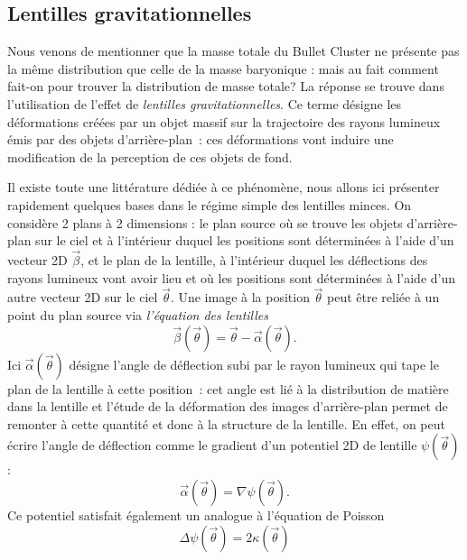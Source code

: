 \subsection{Lentilles gravitationnelles}
Nous venons de mentionner que la masse totale du Bullet Cluster ne présente pas la même distribution que celle de la masse baryonique : mais au fait comment fait-on pour trouver la distribution de masse totale? La réponse se trouve dans l'utilisation de l'effet de \textit{lentilles gravitationnelles}. Ce terme désigne les déformations créées par un objet massif sur la trajectoire des rayons lumineux émis par des objets d'arrière-plan~: ces déformations vont induire une modification de la perception de ces objets de fond.

Il existe toute une littérature dédiée à ce phénomène, nous allons ici présenter rapidement quelques bases dans le régime simple des lentilles minces. On considère 2 plans à 2 dimensions : le plan source où se trouve les objets d'arrière-plan sur le ciel et à l'intérieur duquel les positions sont déterminées à l'aide d'un vecteur 2D $\vec{\beta}$, et le plan de la lentille, à l'intérieur duquel les déflections des rayons lumineux vont avoir lieu et où les positions sont déterminées à l'aide d'un autre vecteur 2D sur le ciel $\vec{\theta}$. Une image à la position $\vec{\theta}$ peut être reliée à un point du plan source via \textit{l'équation des lentilles}
\begin{equation}
\vec{\beta}(\vec{\theta})=\vec{\theta}-\vec{\alpha}(\vec{\theta}).
\end{equation}
Ici $\vec{\alpha}(\vec{\theta})$ désigne l'angle de déflection subi par le rayon lumineux qui tape le plan de la lentille à cette position~: cet angle est lié à la distribution de matière dans la lentille et l'étude de la déformation des images d'arrière-plan permet de remonter à cette quantité et donc à la structure de la lentille. En effet, on peut écrire l'angle de déflection comme le gradient d'un potentiel 2D de lentille $\psi(\vec{\theta})$:
\begin{equation}
\vec{\alpha}(\vec{\theta})=\nabla \psi(\vec{\theta}).
\end{equation}
Ce potentiel satisfait également un analogue à l'équation de Poisson
\begin{equation}
\Delta \psi(\vec{\theta}) = 2 \kappa (\vec{\theta})
\end{equation}
